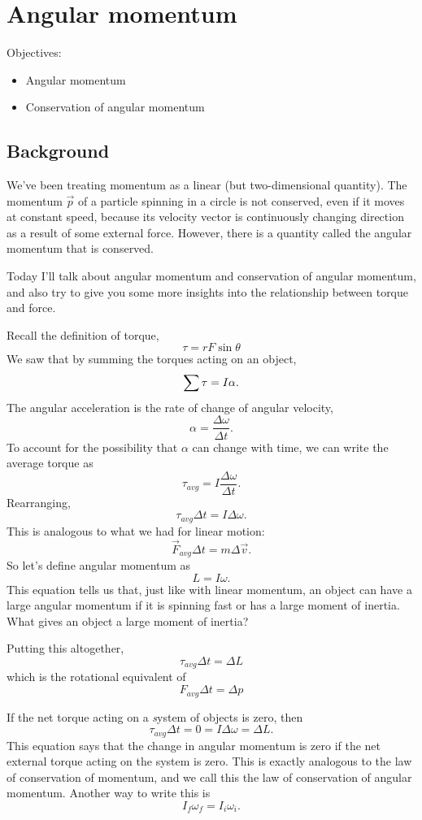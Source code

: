 \section{Angular momentum}
Objectives:
\begin{itemize}
\item Angular momentum
\item Conservation of angular momentum
\end{itemize}

\subsection{Background}
We've been treating momentum as a linear (but two-dimensional quantity). The momentum $\vec{p}$ of a particle spinning in a circle is not conserved, even if it moves at constant speed, because its velocity vector is continuously changing direction as a result of some external force. However, there is a quantity called the angular momentum that is conserved.

Today I'll talk about angular momentum and conservation of angular momentum, and also try to give you some more insights into the relationship between torque and force.

Recall the definition of torque,
$$\tau=rF\sin\theta$$
We saw that by summing the torques acting on an object,
$$\displaystyle\sum\tau=I\alpha.$$
The angular acceleration is the rate of change of angular velocity,
$$\alpha=\frac{\Delta\omega}{\Delta{t}}.$$
To account for the possibility that $\alpha$ can change with time, we can write the average torque as
$$\tau_{avg}=I\frac{\Delta\omega}{\Delta{t}}.$$
Rearranging,
$$\tau_{avg}\Delta{t}=I\Delta{\omega}.$$
This is analogous to what we had for linear motion:
$$\vec{F}_{avg}\Delta{t}=m\Delta{\vec{v}}.$$
So let's define angular momentum as
$$\boxed{L=I\omega}.$$
This equation tells us that, just like with linear momentum, an object can have a large angular momentum if it is spinning fast or has a large moment of inertia. What gives an object a large moment of inertia?

Putting this altogether,
$$\boxed{\tau_{avg}\Delta{t}=\Delta{L}}$$
which is the rotational equivalent of
$$F_{avg}\Delta{t}=\Delta{p}$$

If the net torque acting on a {\textit system} of objects is zero, then
$$\tau_{avg}\Delta{t}=0=I\Delta\omega=\Delta{L}.$$
This equation says that the change in angular momentum is zero if the net external torque acting on the system is zero. This is exactly analogous to the law of conservation of momentum, and we call this the law of conservation of angular momentum. Another way to write this is
$$\boxed{I_f\omega_f=I_i\omega_i}.$$

